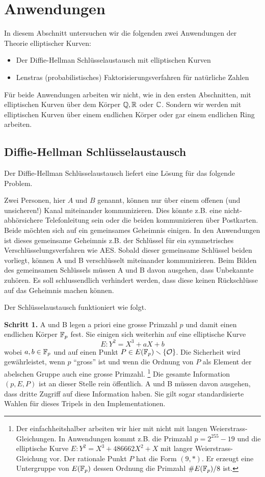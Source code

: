 \chapter{Anwendungen}

In diesem Abschnitt untersuchen wir die folgenden
zwei Anwendungen der Theorie
elliptischer Kurven:

\begin{itemize}
\item Der Diffie-Hellman Schlüsselaustausch mit elliptischen Kurven
\item Lenstras (probabilistisches)
  Faktorisierungsverfahren für natürliche Zahlen
\end{itemize}

Für beide Anwendungen arbeiten wir nicht, wie in den ersten
Abschnitten, mit elliptischen Kurven über dem Körper ${\mathbb{Q}},{\mathbb{R}}$ oder
${\mathbb{C}}$. Sondern wir werden mit elliptischen Kurven über einem endlichen
Körper oder gar einem endlichen Ring arbeiten. 

\section{Diffie-Hellman Schlüsselaustausch}

Der Diffie-Hellman Schlüsselaustausch liefert eine Lösung für das
folgende Problem.

Zwei Personen, hier $A$ und $B$ genannt, können nur über einem offenen
(und unsicheren!)
Kanal miteinander kommunizieren. Dies könnte z.B. eine
nicht-abhörsichere Telefonleitung sein oder die beiden kommunizieren
über Postkarten. Beide möchten sich auf ein gemeinsames Geheimnis
einigen. In den Anwendungen ist dieses gemeinsame Geheimnis z.B. der
Schlüssel für ein symmetrisches Verschlüsselungsverfahren wie 
AES. Sobald dieser gemeinsame Schlüssel beiden vorliegt, können A
und B  verschlüsselt miteinander kommunizieren. Beim
Bilden des gemeinsamen Schlüssels müssen A und B davon ausgehen, dass
Unbekannte zuhören. Es soll schlussendlich verhindert werden, dass
diese keinen Rückschlüsse auf das Geheimnis machen können.

Der Schlüsselaustausch funktioniert wie folgt.

\bigskip
\textbf{Schritt 1.} A und B legen a priori 
eine grosse Primzahl $p$ und damit einen endlichen Körper ${\mathbb{F}}_p$ fest.
Sie einigen sich weiterhin auf eine elliptische Kurve
$$E: Y^2 = X^3+aX+b$$
wobei $a,b\in{\mathbb{F}}_p$ und auf einen Punkt $P\in
E({\mathbb{F}}_p)\smallsetminus\{{\mathcal O}\}$. Die Sicherheit wird gewährleistet, wenn $p$
``gross'' ist und wenn die Ordnung von $P$ als Element der abelschen
Gruppe auch eine grosse  Primzahl.  
\footnote{Der einfachheitshalber arbeiten wir hier
  mit nicht mit langen Weierstrass-Gleichungen. In Anwendungen kommt
  z.B. die Primzahl 
 $p = 2^{255}-19$ und die elliptische Kurve
  $E: Y^2 = X^3+486662X^2+X$ mit langer Weierstrass-Gleichung vor. Der
rationale Punkt $P$ hat die Form $(9,*)$. Er erzeugt eine Untergruppe
von $E({\mathbb{F}}_p)$ dessen Ordnung die Primzahl $\#E({\mathbb{F}}_p)/8$ ist.}
Die gesamte Information $(p,E,P)$ ist an dieser Stelle rein
öffentlich. 
A und B müssen davon ausgehen, dass dritte Zugriff auf
diese Information haben.
Sie gilt sogar standardisierte Wahlen für  dieses Tripels in den Implementationen.

